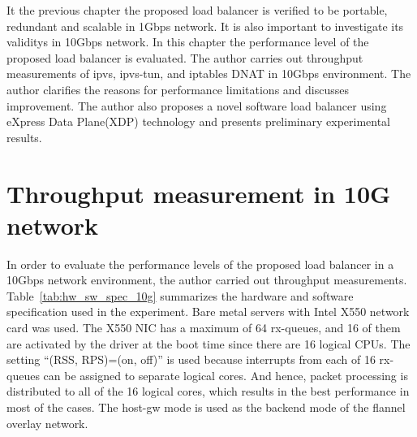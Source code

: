 
It the previous chapter the proposed load balancer is verified to be portable, redundant and scalable in 1Gbps network.
It is also important to investigate its validitys in 10Gbps network.
In this chapter the performance level of the proposed load balancer is evaluated.
The author carries out throughput measurements of ipvs, ipvs-tun, and iptables DNAT in 10Gbps environment.
The author clarifies the reasons for performance limitations and discusses improvement.
The author also proposes a novel software load balancer using eXpress Data Plane(XDP) technology and presents preliminary experimental results.

\section{Throughput measurement in 10G network}

In order to evaluate the performance levels of the proposed load balancer in a 10Gbps network environment, the author carried out throughput measurements.
Table~\ref{tab:hw_sw_spec_10g} summarizes the hardware and software specification used in the experiment.
Bare metal servers with Intel X550 network card was used.
The X550 NIC has a maximum of 64 rx-queues, and 16 of them are activated by the driver at the boot time since there are 16 logical CPUs.
The setting \enquote{(RSS, RPS)=(on, off)} is used because interrupts from each of 16 rx-queues can be assigned to separate logical cores.
And hence, packet processing is distributed to all of the 16 logical cores, which results in the best performance in most of the cases.
The host-gw mode is used as the backend mode of the flannel overlay network.

